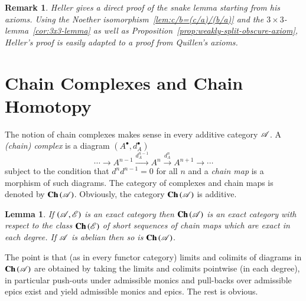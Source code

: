 \documentclass[1p]{elsarticle}
\makeatletter
\renewenvironment{proof}[1][\proofname]{\par
  \pushQED{\qed}%
  \normalfont \topsep6\p@\@plus6\p@\relax
  \trivlist
  \item[\hskip\labelsep
        \scshape
    #1\@addpunct{.}]\ignorespaces
}{%
  \popQED\endtrivlist\@endpefalse
}
\theoremstyle{mythm}
\newtheorem{Lem}[Thm]{Lemma}
\theoremstyle{mydef}
\newtheorem{Rem}[Thm]{Remark}
\makeatother
\begin{document}
\begin{Rem}
  Heller \cite[4.3]{MR0100622} gives a direct proof of the snake
  lemma starting from his
  axioms. Using the Noether isomorphism~\ref{lem:c/b=(c/a)/(b/a)} and
  the $3 \times 3$-lemma~\ref{cor:3x3-lemma} as well as
  Proposition~\ref{prop:weakly-split-obscure-axiom}, 
  Heller's proof is easily
  adapted to a proof from Quillen's axioms.
\end{Rem}


\section{Chain Complexes and Chain Homotopy}
\label{sec:ch-cxes-ch-htpy}

The notion of chain complexes makes sense in every additive category 
$\operatorname{\mathscr{A}}$. A \emph{(chain) complex} is a diagram
$(A^{\bullet}, d_{A}^{\bullet})$ 
\[
\cdots \xrightarrow{} A^{n-1} \xrightarrow{d_{A}^{n-1}} A^{n}
\xrightarrow{d_{A}^{n}} A^{n+1} \xrightarrow{} \cdots
\]
subject to the condition that $d^{n} d^{n-1} = 0$ for all $n$ and a
\emph{chain map} is a morphism of such diagrams. The category of
complexes and chain maps is denoted by $\operatorname{\mathbf{Ch}}{(\operatorname{\mathscr{A}})}$. 
Obviously, the category $\operatorname{\mathbf{Ch}}{(\operatorname{\mathscr{A}})}$ is additive.

\begin{Lem}
  \label{lem:cxes-exact}
  If $(\operatorname{\mathscr{A}},\operatorname{\mathscr{E}})$ is an exact category then $\operatorname{\mathbf{Ch}}{(\operatorname{\mathscr{A}})}$ is an
  exact category with respect to the class $\operatorname{\mathbf{Ch}}{(\operatorname{\mathscr{E}})}$
  of short sequences of chain maps which are exact in each degree. 
  If $\operatorname{\mathscr{A}}$ is abelian then so is $\operatorname{\mathbf{Ch}}{(\operatorname{\mathscr{A}})}$.
\end{Lem}

\begin{proof}
  The point is that (as in every functor category)
  limits and colimits of diagrams in $\operatorname{\mathbf{Ch}}{(\operatorname{\mathscr{A}})}$
  are obtained by taking the limits and colimits pointwise 
  (in each degree), in
  particular push-outs under admissible monics and pull-backs over
  admissible epics exist and yield admissible monics and epics. The
  rest is obvious.
\end{proof}
\end{document}
